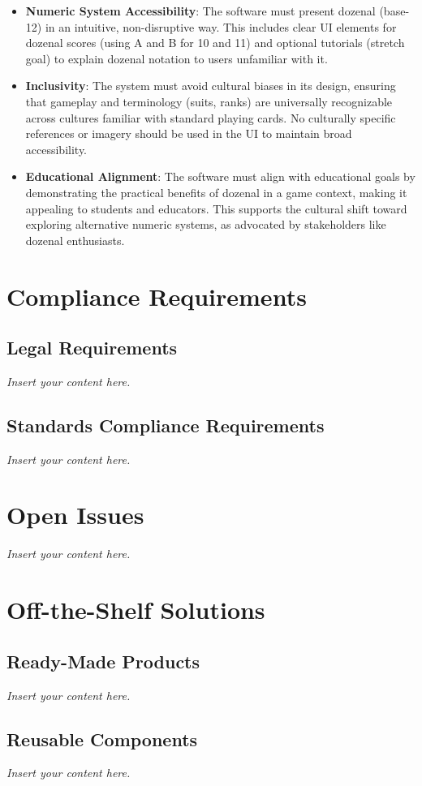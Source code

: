 \documentclass[12pt]{article}
\newcommand{\lips}{\textit{Insert your content here.}}
\begin{document}
\begin{itemize}
    \item \textbf{Numeric System Accessibility}: The software must present dozenal (base-12) in an intuitive, non-disruptive way. This includes clear UI elements for dozenal scores (using A and B for 10 and 11) and optional tutorials (stretch goal) to explain dozenal notation to users unfamiliar with it.
    \item \textbf{Inclusivity}: The system must avoid cultural biases in its design, ensuring that gameplay and terminology (suits, ranks) are universally recognizable across cultures familiar with standard playing cards. No culturally specific references or imagery should be used in the UI to maintain broad accessibility.
    \item \textbf{Educational Alignment}: The software must align with educational goals by demonstrating the practical benefits of dozenal in a game context, making it appealing to students and educators. This supports the cultural shift toward exploring alternative numeric systems, as advocated by stakeholders like dozenal enthusiasts.
\end{itemize}

\section{Compliance Requirements}
\subsection{Legal Requirements}
\lips
\subsection{Standards Compliance Requirements}
\lips

\section{Open Issues}
\lips

\section{Off-the-Shelf Solutions}
\subsection{Ready-Made Products}
\lips
\subsection{Reusable Components}
\lips
\end{document}

